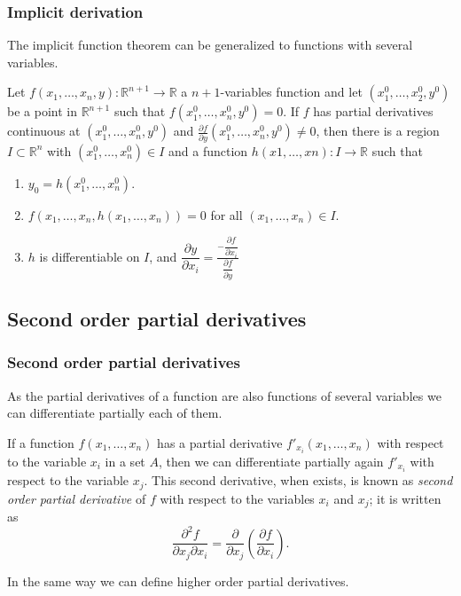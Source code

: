 \begin{frame}
\frametitle{Implicit derivation}
The implicit function theorem can be generalized to functions with several variables.

\begin{theorem}
Let $f(x_1,\ldots,x_n,y):\mathbb{R}^{n+1}\longrightarrow \mathbb{R}$ a $n+1$-variables function and let $(x_1^0,\ldots, x_2^0,y^0)$ be a point in $\mathbb{R}^{n+1}$ such that $f(x_1^0,\ldots,x_n^0,y^0)=0$.
If $f$ has partial derivatives continuous at $(x_1^0,\ldots,x_n^0,y^0)$ and $\frac{\partial f}{\partial y}(x_1^0,\ldots,x_n^0,y^0)\neq 0$, then there is a region $I\subset \mathbb{R}^n$ with $(x_1^0,\ldots,x_n^0)\in I$ and a function $h(x1,\ldots, xn): I\longrightarrow \mathbb{R}$ such that
\begin{enumerate}
\item $y_0=h(x_1^0,\ldots,x_n^0)$.
\item $f(x_1,\ldots,x_n,h(x_1,\ldots,x_n))=0$ for all $(x_1,\ldots,x_n)\in I$.
\item $h$ is differentiable on $I$, and $\dfrac{\partial y}{\partial x_i}=\frac{-\dfrac{\partial f}{\partial x_i}}{\dfrac{\partial f}{\partial y}}$
\end{enumerate}
\end{theorem}
\end{frame}



\subsection{Second order partial derivatives}
\begin{frame}
\frametitle{Second order partial derivatives}
As the partial derivatives of a function are also functions of several variables we can differentiate partially each of them.

If a function $f(x_1,\ldots,x_n)$ has a partial derivative $f'_{x_i}(x_1,\ldots,x_n)$ with respect to the variable $x_i$ in a set $A$, then we can differentiate partially again $f'_{x_i}$ with respect to the variable $x_j$.
This second derivative, when exists, is known as \emph{second order partial derivative} of $f$ with respect to the variables $x_i$ and $x_j$; it is written as
\[
\frac{\partial ^2 f}{\partial x_j \partial x_i}= \frac{\partial}{\partial x_j}\left(\frac{\partial f}{\partial x_i}\right).
\]

In the same way we can define higher order partial derivatives.
\end{frame}


